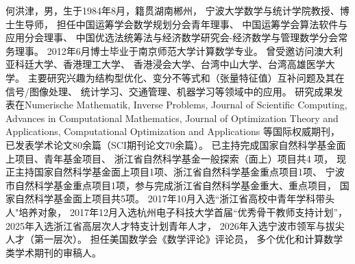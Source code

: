 

\begin{cvparagraph}

何洪津，男，生于1984年8月，籍贯湖南郴州，
宁波大学数学与统计学院教授、博士生导师，
担任中国运筹学会数学规划分会青年理事、
中国运筹学会算法软件与应用分会理事、
中国优选法统筹法与经济数学研究会-经济数学与管理数学分会常务理事。
2012年6月博士毕业于南京师范大学计算数学专业。
曾受邀访问澳大利亚科廷大学、香港理工大学、
香港浸会大学、台湾中山大学、台湾高雄医学大学。
主要研究兴趣为结构型优化、变分不等式和（张量特征值）互补问题及其在信号/图像处理、
统计学习、交通管理、机器学习等领域中的应用。
研究成果发表在Numerische Mathematik, Inverse Problems, 
Journal of Scientific Computing, Advances in Computational Mathematics, 
Journal of Optimization Theory and Applications, 
Computational Optimization and Applications 等国际权威期刊，
已发表学术论文80余篇（SCI期刊论文70余篇）。
已主持完成国家自然科学基金面上项目、青年基金项目、
浙江省自然科学基金一般探索（面上）项目共4 项，
现正主持国家自然科学基金面上项目1项、浙江省自然科学基金重点项目1项、
宁波市自然科学基金重点项目1项，参与完成浙江省自然科学基金重大、重点项目，
国家自然科学基金面上项目共5项。
2017年10月入选``浙江省高校中青年学科带头人"培养对象，
2017年12月入选杭州电子科技大学首届“优秀骨干教师支持计划”，
2025年入选浙江省高层次人才特支计划青年人才，
2026年入选宁波市领军与拔尖人才（第一层次）。
担任美国数学会《数学评论》评论员，
多个优化和计算数学类学术期刊的审稿人。

\end{cvparagraph}
